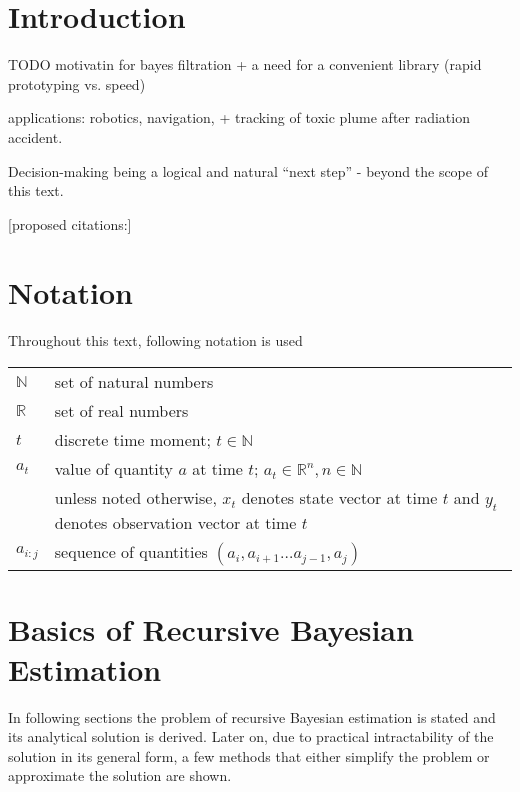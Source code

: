 \documentclass[a4paper,12pt,oneside]{report}
\newif\ifrelease %
\begin{document}
\ifrelease
\fi


\newpage
\tableofcontents


\chapter*{Introduction} 

TODO motivatin for bayes filtration + a need for a convenient library (rapid prototyping vs. speed)

applications: robotics, navigation, + tracking of toxic plume after radiation accident.

Decision-making being a logical and natural ``next step'' - beyond the scope of this text.

[proposed citations:\cite{ThrBurFox:05,Gus:02,HofSmi:09,HofSmiPech:09,PechHofSmi:09}]


\chapter*{Notation} 

Throughout this text, following notation is used

\bigskip

\begin{tabular}{l p{}}
	\(\mathbb{N}\) & set of natural numbers \\
	\(\mathbb{R}\) & set of real numbers \\
	\(t\) & discrete time moment; \(t \in \mathbb{N}\) \\
	\(a_t\) & value of quantity \(a\) at time \(t\); \(a_t \in \mathbb{R}^n, n \in \mathbb{N}\) \\
		& unless noted otherwise, \(x_t\) denotes state vector at time \(t\) and \(y_t\) denotes
		  observation vector at time \(t\) \\
	\(a_{i:j}\) & sequence of quantities \((a_i, a_{i+1} \dots a_{j-1}, a_j)\) \\
\end{tabular}


\chapter{Basics of Recursive Bayesian Estimation}

In following sections the problem of recursive Bayesian estimation is stated and its analytical
solution is derived. Later on, due to practical intractability of the solution in its general form,
a few methods that either simplify the problem or approximate the solution are shown.
\end{document}
